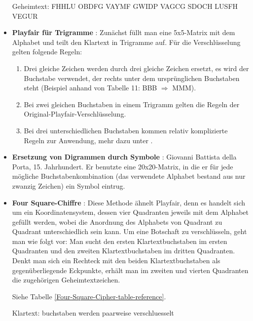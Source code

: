 \begin{refsegment}
\begin{itemize}
   Geheimtext: FHHLU OBDFG VAYMF GWIDP VAGCG SDOCH LUSFH VEGUR\\


\item {\bf Playfair für Trigramme} \cite{Savard1999}:
Zunächst füllt man eine 5x5-Matrix mit dem Alphabet und teilt den Klartext
in Trigramme auf. Für die Verschlüsselung gelten folgende Regeln:
   \begin{enumerate}
      \item Drei gleiche Zeichen werden durch drei gleiche Zeichen ersetzt,
         es wird der Buchstabe verwendet, der rechts unter dem ursprünglichen
         Buchstaben steht (Beispiel anhand von Tabelle 11:
         BBB $ \Rightarrow $ MMM).
      \item Bei zwei gleichen Buchstaben in einem Trigramm gelten die Regeln
         der Original-Playfair-Verschlüsselung.
      \item Bei drei unterschiedlichen Buchstaben kommen relativ komplizierte
         Regeln zur Anwendung, mehr dazu unter \cite{Savard1999}.
   \end{enumerate}


\item {\bf Ersetzung von Digrammen durch Symbole} \cite{Savard1999}:
   Giovanni Battista della Porta, 15. Jahrhundert. Er benutzte eine
   20x20-Matrix, in die er für jede mögliche Buchstabenkombination (das
   verwendete Alphabet bestand aus nur zwanzig Zeichen) ein Symbol eintrug.


\item {\bf Four Square-Chiffre} \cite{Savard1999}:
   Diese Methode ähnelt Playfair, denn es handelt sich um ein
   Koordinatensystem, dessen vier Quadranten jeweils mit dem Alphabet gefüllt
   werden, wobei die Anordnung des Alphabets von Quadrant zu Quadrant
   unterschiedlich sein kann. Um eine Botschaft zu verschlüsseln, geht man wie
   folgt vor:
   Man sucht den ersten Klartextbuchstaben im ersten Quadranten und den zweiten
   Klartextbuchstaben im dritten Quadranten. Denkt man sich ein Rechteck mit
   den beiden Klartextbuchstaben als gegenüberliegende Eckpunkte, erhält man
   im zweiten und vierten Quadranten die zugehörigen Geheimtextzeichen.

   Siehe Tabelle \ref{Four-Square-Cipher-table-reference}.

   Klartext: buchstaben werden paarweise verschluesselt


\end{itemize}
\end{refsegment}
